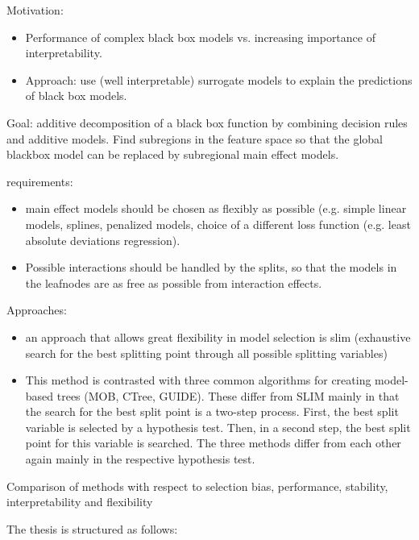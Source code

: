 Motivation:
\begin{itemize}
    \item Performance of complex black box models vs. increasing importance of interpretability.
    \item Approach: use (well interpretable) surrogate models to explain the predictions of black box models. 
\end{itemize}


Goal: additive decomposition of a black box function by combining decision rules and additive models.
Find subregions in the feature space so that the global blackbox model can be replaced by subregional main effect models.



requirements:
\begin{itemize}
    \item main effect models should be chosen as flexibly as possible (e.g. simple linear models, splines, penalized models, choice of a different loss function (e.g. least absolute deviations regression).
    \item Possible interactions should be handled by the splits, so that the models in the leafnodes are as free as possible from interaction effects.
\end{itemize}

Approaches:
\begin{itemize}
    \item an approach that allows great flexibility in model selection is slim \citep{Hu.2020} (exhaustive search for the best splitting point through all possible splitting variables)
    \item This method is contrasted with three common algorithms for creating model-based trees (MOB, CTree, GUIDE). These differ from SLIM mainly in that the search for the best split point is a two-step process. First, the best split variable is selected by a hypothesis test. Then, in a second step, the best split point for this variable is searched. The three methods differ from each other again mainly in the respective hypothesis test.
\end{itemize}

Comparison of methods with respect to selection bias, performance, stability, interpretability and flexibility

The thesis is structured as follows: